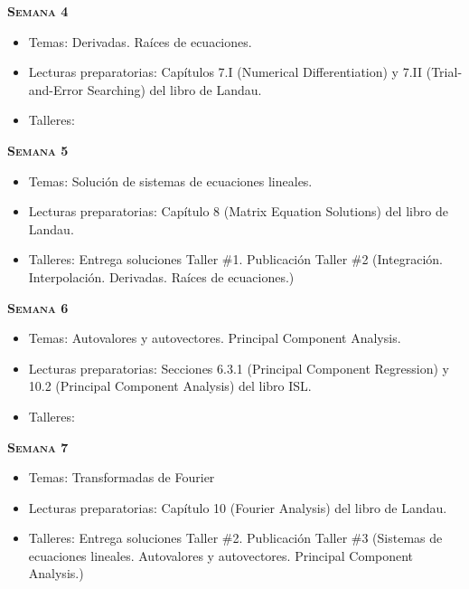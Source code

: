 \documentclass[letterpaper,10pt,onecolumn]{article}
\begin{document}
\noindent\textbf{\textsc{Semana 4}}\\[-0.5cm]
\begin{itemize}
\item Temas: Derivadas. Ra\'ices de ecuaciones. \\[-0.6cm]
\item Lecturas preparatorias: Cap\'itulos 7.I (Numerical
  Differentiation) y 7.II (Trial-and-Error Searching) del libro de
  Landau.\\[-0.6cm] 
\item Talleres: \\[-0.6cm] 
\end{itemize}

\noindent\textbf{\textsc{Semana 5}}\\[-0.5cm]
\begin{itemize}
\item Temas: Soluci\'on de sistemas de ecuaciones lineales.\\[-0.6cm] 
\item Lecturas preparatorias:  Cap\'itulo 8 (Matrix Equation Solutions)
  del libro de Landau. \\[-0.6cm]
\item Talleres: 
Entrega soluciones Taller \#1.
Publicaci\'on Taller \#2
(Integraci\'on. Interpolaci\'on. Derivadas. Ra\'ices de ecuaciones.) 
\\[-0.6cm] 
\end{itemize}

\noindent\textbf{\textsc{Semana 6}}\\[-0.5cm]
\begin{itemize}
\item Temas: Autovalores y autovectores. Principal Component
  Analysis. \\[-0.6cm]
\item Lecturas preparatorias: Secciones 6.3.1 (Principal Component
  Regression) y 10.2 (Principal Component Analysis) del libro ISL.\\[-0.6cm]
\item Talleres: \\[-0.6cm]
\end{itemize}

\noindent\textbf{\textsc{Semana 7}}\\[-0.5cm]
\begin{itemize}
\item Temas: Transformadas de Fourier\\[-0.6cm]
\item Lecturas preparatorias: Cap\'itulo 10 (Fourier Analysis) del
  libro de Landau.\\[-0.6cm] 
\item Talleres: 
Entrega soluciones Taller \#2. 
Publicaci\'on Taller \#3
(Sistemas de ecuaciones lineales. Autovalores y
autovectores. Principal Component Analysis.)
\\[-0.6cm]
\end{itemize}
\end{document}
